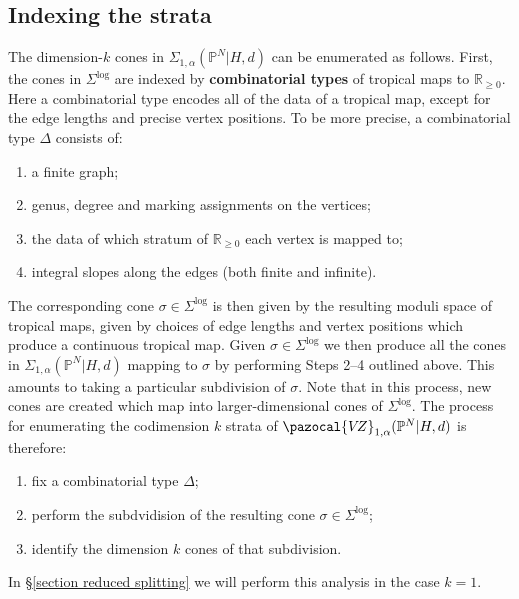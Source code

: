 \documentclass[11pt]{amsart}
\newcommand{\PP}{\mathbb P}
\newcommand{\VZ}{\pazocal{V\!Z}}
\newcommand{\RR}{\mathbb{R}}
\theoremstyle{definition}
\theoremstyle{definition}
\begin{document}
\subsection{Indexing the strata} \label{subsection indexing strata} The dimension-$k$ cones in $\Sigma_{1,\alpha}(\PP^N|H,d)$ can be enumerated as follows. First, the cones in $\Sigma^{\operatorname{log}}$ are indexed by \textbf{combinatorial types} of tropical maps to $\RR_{\geq 0}$. Here a combinatorial type encodes all of the data of a tropical map, except for the edge lengths and precise vertex positions. To be more precise, a combinatorial type $\Delta$ consists of:
\begin{enumerate}
\item a finite graph;
\item genus, degree and marking assignments on the vertices;
\item the data of which stratum of $\RR_{\geq 0}$ each vertex is mapped to;
\item integral slopes along the edges (both finite and infinite).
\end{enumerate}
The corresponding cone $\sigma \in \Sigma^{\operatorname{log}}$ is then given by the resulting moduli space of tropical maps, given by choices of edge lengths and vertex positions which produce a continuous tropical map. Given $\sigma\in \Sigma^{\operatorname{log}}$ we then produce all the cones in $\Sigma_{1,\alpha}(\PP^N|H,d)$ mapping to $\sigma$ by performing Steps 2--4 outlined above. This amounts to taking a particular subdivision of $\sigma$. Note that in this process, new cones are created which map into larger-dimensional cones of $\Sigma^{\operatorname{log}}$. The process for enumerating the codimension $k$ strata of $\VZ_{1,\alpha}(\PP^N|H,d)$ is therefore:
\begin{enumerate}
\item fix a combinatorial type $\Delta$;
\item perform the subdvidision of the resulting cone $\sigma \in \Sigma^{\operatorname{log}}$;
\item identify the dimension $k$ cones of that subdivision.
\end{enumerate}
In \S \ref{section reduced splitting} we will perform this analysis in the case $k=1$.
\end{document}
